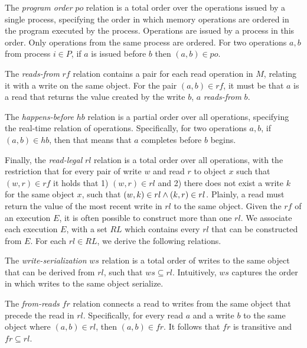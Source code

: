 The \emph{program order} $po$ relation is a total order over the operations issued by a single process, specifying the order in which memory operations are ordered in the program executed by the process. Operations are issued by a process in this order. Only operations from the same process are ordered. For two operations $a, b$ from process $i \in P$,  if $a$ is issued before $b$ then $(a, b) \in po$. 


\custvspace\noindent
The \emph{reads-from} $rf$ relation contains a pair for each read operation in $M$, relating it with a write on the same object.
For the pair $(a, b) \in rf$, it must be that $a$ is a read that returns the value created by the write $b$, \ie $a$ \emph{reads-from} $b$.

\custvspace\noindent
The \emph{happens-before} $hb$ relation is a partial order over all operations, specifying the real-time relation of operations.
Specifically, for two operations $a, b$, if $(a, b) \in hb$, then that means that $a$ completes before $b$ begins. %

\custvspace\noindent
Finally, the \emph{read-legal} $rl$ relation is a total order over all operations, with the restriction that for every pair of write $w$ and read $r$ to object $x$ such that $(w, r) \in rf$ it holds that 1) $(w, r) \in rl$ and 2) there does not exist a write $k$ for the same object $x$, such that $(w, k) \in rl \wedge (k, r) \in rl$.
Plainly, a read must return the value of the most recent write in $rl$ to the same object.
Given the $rf$ of an execution $E$, it is often possible to construct more than one $rl$. We associate each execution $E$, with a set $RL$ which contains every $rl$ that can be constructed from $E$. 
For each $rl \in RL$, we derive the following relations.

The \emph{write-se\-riali\-za\-tion} $ws$ relation is a total order of writes to the same object that can be derived from $rl$, such that $ws \subseteq rl$. Intuitively, $ws$ captures the order in which writes to the same object serialize.

\custvspace\noindent
The \emph{from-reads} $fr$ relation connects a read to writes from the same object that precede the read in $rl$. Specifically, for every read $a$ and a write $b$ to the same object where $(a, b) \in rl$, then  $(a, b) \in fr$.
It follows that $fr$ is transitive and $fr \subseteq rl$. 


